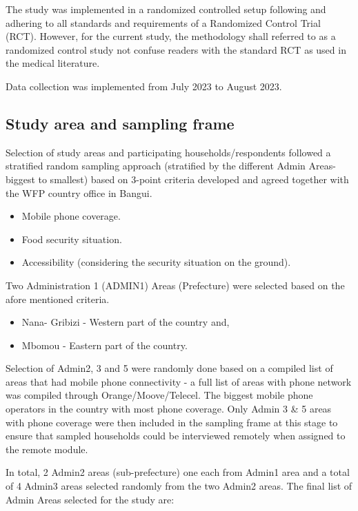 \documentclass[11pt,harvard]{article}
\begin{document}
The study was implemented in a randomized controlled setup following and adhering to all standards and requirements of a Randomized Control Trial (RCT). However, for the current study, the methodology shall referred to as a randomized control study not confuse readers with the standard RCT as used in the medical literature. 
	
 
	
	
Data collection was implemented from July 2023 to August 2023.

\subsection{Study area and sampling frame}
	
Selection of study areas and participating households/respondents followed a stratified random sampling approach (stratified by the different Admin Areas-biggest to smallest) based on 3-point criteria developed and agreed together with the WFP country office in Bangui. 
	
	\begin{itemize} [label=--, left=1.5em]
	\item[1.] Mobile phone coverage.
	\item[2.] Food security situation.
	\item[3.] Accessibility (considering the security situation on the ground).
	\end{itemize}
	
	Two Administration 1 (ADMIN1) Areas (Prefecture) were selected based on the afore mentioned criteria. 
	\begin{itemize}[label=--, left=1.5em]
	\item[1.] Nana- Gribizi - Western part of the country and,
	\item[2.] Mbomou - Eastern part of the country.
	\end{itemize}

Selection of Admin2, 3 and 5 were randomly done based on a compiled list of areas that had mobile phone connectivity - a full list of areas with phone network was compiled through Orange/Moove/Telecel. The biggest mobile phone operators in the country with most phone coverage. Only Admin 3 \& 5 areas with phone coverage were then included in the sampling frame at this stage to ensure that sampled households could be interviewed remotely when assigned to the remote module. 
	
In total, 2 Admin2 areas (sub-prefecture) one each from Admin1 area and a total of 4 Admin3 areas selected randomly from the two Admin2 areas. The final list of Admin Areas selected for the study are:
	
\end{document}

